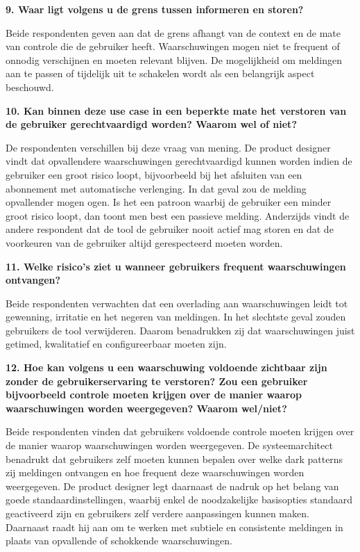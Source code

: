 \vspace{1em}

\textbf{9. Waar ligt volgens u de grens tussen informeren en storen?}

Beide respondenten geven aan dat de grens afhangt van de context en de mate van controle die de gebruiker heeft. Waarschuwingen mogen niet te frequent of onnodig verschijnen en moeten relevant blijven. De mogelijkheid om meldingen aan te passen of tijdelijk uit te schakelen wordt als een belangrijk aspect beschouwd.

\vspace{1em}

\textbf{10. Kan binnen deze use case in een beperkte mate het verstoren van de gebruiker gerechtvaardigd worden? Waarom wel of niet?}

De respondenten verschillen bij deze vraag van mening. De product designer vindt dat opvallendere waarschuwingen gerechtvaardigd kunnen worden indien de gebruiker een groot risico loopt, bijvoorbeeld bij het afsluiten van een abonnement met automatische verlenging. In dat geval zou de melding opvallender mogen ogen. Is het een patroon waarbij de gebruiker een minder groot risico loopt, dan toont men best een passieve melding. Anderzijds vindt de andere respondent dat de tool de gebruiker nooit actief mag storen en dat de voorkeuren van de gebruiker altijd gerespecteerd moeten worden.

\vspace{1em}

\textbf{11. Welke risico's ziet u wanneer gebruikers frequent waarschuwingen ontvangen?}

Beide respondenten verwachten dat een overlading aan waarschuwingen leidt tot gewenning, irritatie en het negeren van meldingen. In het slechtste geval zouden gebruikers de tool verwijderen. Daarom benadrukken zij dat waarschuwingen juist getimed, kwalitatief en configureerbaar moeten zijn.

\newpage

\textbf{12. Hoe kan volgens u een waarschuwing voldoende zichtbaar zijn zonder de gebruikerservaring te verstoren? Zou een gebruiker bijvoorbeeld controle moeten krijgen over de manier waarop waarschuwingen worden weergegeven? Waarom wel/niet?}

Beide respondenten vinden dat gebruikers voldoende controle moeten krijgen over de manier waarop waarschuwingen worden weergegeven. De systeemarchitect benadrukt dat gebruikers zelf moeten kunnen bepalen over welke dark patterns zij meldingen ontvangen en hoe frequent deze waarschuwingen worden weergegeven. De product designer legt daarnaast de nadruk op het belang van goede standaardinstellingen, waarbij enkel de noodzakelijke basisopties standaard geactiveerd zijn en gebruikers zelf verdere aanpassingen kunnen maken. Daarnaast raadt hij aan om te werken met subtiele en consistente meldingen in plaats van opvallende of schokkende waarschuwingen.

